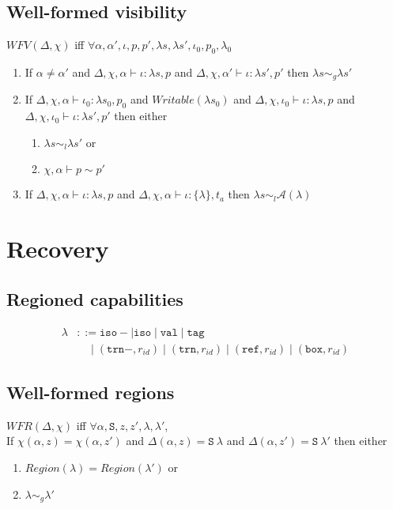 \documentclass[format=acmsmall, authordraft, authorversion]{acmart}\settopmatter{printfolios=true,printccs=false,printacmref=false}
\newcommand{\Alias}{\mathcal{A}}
\newcommand{\lambdas}{\lambda s}
\begin{document}
\subsection{Well-formed visibility}
$\textit{WFV}(\Delta, \chi)$ iff $\forall \alpha, \alpha', \iota, p, p', \lambdas, \lambdas', \iota_0, p_0, \lambda_0$
\begin{enumerate}
    \item If $\alpha \neq \alpha'$
        and $\Delta, \chi, \alpha \vdash \iota : \lambdas, p$
        and $\Delta, \chi, \alpha' \vdash \iota : \lambdas', p'$
        then $\lambdas \sim_g \lambdas'$

    \item If $\Delta, \chi, \alpha \vdash \iota_0 : \lambdas_0, p_0$
        and $\textit{Writable}(\lambdas_0)$
        and $\Delta, \chi, \iota_0 \vdash \iota : \lambdas, p$
        and $\Delta, \chi, \iota_0 \vdash \iota : \lambdas', p'$
        then either
        \begin{enumerate}
            \item $\lambdas \sim_l \lambdas'$ or
            \item $\chi, \alpha \vdash p \sim p'$
        \end{enumerate}

    \item If $\Delta, \chi, \alpha \vdash \iota : \lambdas, p$
        and $\Delta, \chi, \alpha \vdash \iota : \{ \lambda \}, t_a$
        then $\lambdas \sim_l \Alias(\lambda)$
\end{enumerate}

\section{Recovery}
\subsection{Regioned capabilities}
\begin{align*}
    \lambda &::= \texttt{iso}- \mid \texttt{iso} \mid \texttt{val} \mid \texttt{tag} \\
    &\quad \mid (\texttt{trn}-, r_{id}) \mid (\texttt{trn}, r_{id}) \mid (\texttt{ref}, r_{id}) \mid (\texttt{box}, r_{id}) 
\end{align*}

\subsection{Well-formed regions}
$\textit{WFR}(\Delta, \chi)$ iff $\forall \alpha, \mathtt{S}, z, z', \lambda, \lambda'$,\\
If $\chi(\alpha, z) = \chi(\alpha, z')$
and $\Delta(\alpha, z) = \mathtt{S}\ \lambda$
and $\Delta(\alpha, z') = \mathtt{S}\ \lambda'$
then either
\begin{enumerate}
    \item $\mathit{Region}(\lambda) = \mathit{Region}(\lambda')$ or
    \item $\lambda \sim_g \lambda'$
\end{enumerate}
\end{document}
